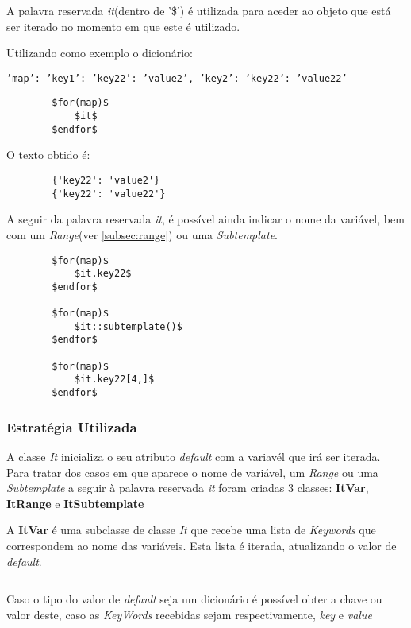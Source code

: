 \documentclass[../relatorio.tex]{subfiles}
\begin{document}
    A palavra reservada \textit{it}(dentro de '\$') é utilizada
    para aceder ao objeto que está ser iterado no momento em que
    este é utilizado.

    Utilizando como exemplo o dicionário:
    
    \texttt{'map': {'key1': {'key22': 'value2'}, 'key2': {'key22': 'value22'}}}

    \begin{verbatim}
        $for(map)$
            $it$
        $endfor$
    \end{verbatim}

    O texto obtido é:
    \begin{verbatim}
        {'key22': 'value2'}
        {'key22': 'value22'}
    \end{verbatim}

    A seguir da palavra reservada \textit{it}, é possível ainda indicar
    o nome da variável, bem com um \textit{Range}(ver \ref{subsec:range})
    ou uma \textit{Subtemplate}.

    \begin{verbatim}
        $for(map)$
            $it.key22$
        $endfor$

        $for(map)$
            $it::subtemplate()$
        $endfor$

        $for(map)$
            $it.key22[4,]$
        $endfor$
    \end{verbatim}

    \subsubsection{Estratégia Utilizada}

    A classe \textit{It} inicializa o seu atributo \textit{default}
    com a variavél que irá ser iterada. Para tratar dos casos em que
    aparece o nome de variável, um \textit{Range} ou uma \textit{Subtemplate}
    a seguir à palavra reservada \textit{it} foram criadas 3 classes: \textbf{ItVar}, 
    \textbf{ItRange} e \textbf{ItSubtemplate}


    A \textbf{ItVar} é uma subclasse de classe \textit{It} que recebe uma lista de \textit{Keywords}
    que correspondem ao nome das variáveis. Esta lista é iterada,
    atualizando o valor de \textit{default}. 
    
    \inputminted[firstline=11, lastline=17]{py}{../modules/It/ItVar.py}
    
    Caso o tipo do valor de \textit{default} seja um dicionário é possível obter
    a chave ou valor deste, caso as \textit{KeyWords} recebidas sejam respectivamente,
    \textit{key} e \textit{value}
\end{document}
